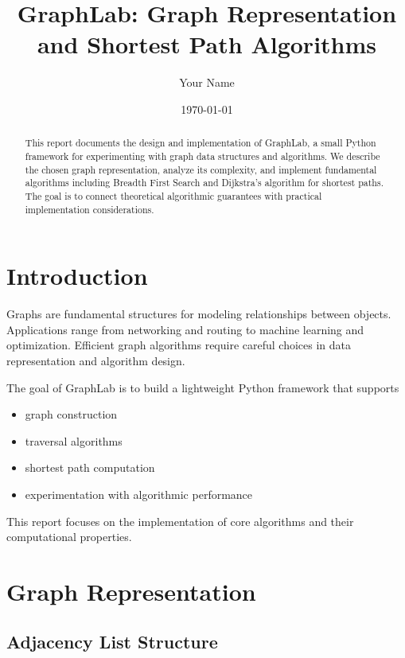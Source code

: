 \documentclass[11pt]{article}
\title{GraphLab: Graph Representation and Shortest Path Algorithms}
\author{Your Name}
\date{\today}
\begin{document}
\maketitle

\begin{abstract}
This report documents the design and implementation of GraphLab, a small
Python framework for experimenting with graph data structures and algorithms.
We describe the chosen graph representation, analyze its complexity, and
implement fundamental algorithms including Breadth First Search and Dijkstra's
algorithm for shortest paths. The goal is to connect theoretical algorithmic
guarantees with practical implementation considerations.
\end{abstract}

\section{Introduction}

Graphs are fundamental structures for modeling relationships between objects.
Applications range from networking and routing to machine learning and
optimization. Efficient graph algorithms require careful choices in data
representation and algorithm design.

The goal of GraphLab is to build a lightweight Python framework that supports

\begin{itemize}
\item graph construction
\item traversal algorithms
\item shortest path computation
\item experimentation with algorithmic performance
\end{itemize}

This report focuses on the implementation of core algorithms and their
computational properties.

\section{Graph Representation}

\subsection{Adjacency List Structure}
\end{document}
